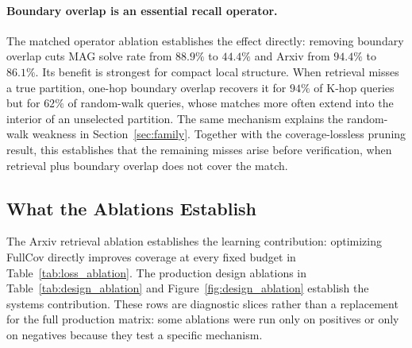 \documentclass[runningheads]{llncs}
\begin{document}
\paragraph{Boundary overlap is an essential recall operator.}
The matched operator ablation establishes the effect directly: removing boundary overlap cuts MAG solve rate from $88.9\%$ to $44.4\%$ and Arxiv from $94.4\%$ to $86.1\%$. Its benefit is strongest for compact local structure. When retrieval misses a true partition, one-hop boundary overlap recovers it for $94\%$ of K-hop queries but for $62\%$ of random-walk queries, whose matches more often extend into the interior of an unselected partition. The same mechanism explains the random-walk weakness in Section~\ref{sec:family}. Together with the coverage-lossless pruning result, this establishes that the remaining misses arise before verification, when retrieval plus boundary overlap does not cover the match.

\subsection{What the Ablations Establish}

The Arxiv retrieval ablation establishes the learning contribution: optimizing FullCov directly improves coverage at every fixed budget in Table~\ref{tab:loss_ablation}. The production design ablations in Table~\ref{tab:design_ablation} and Figure~\ref{fig:design_ablation} establish the systems contribution. These rows are diagnostic slices rather than a replacement for the full production matrix: some ablations were run only on positives or only on negatives because they test a specific mechanism.
\end{document}
